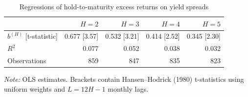 \begin{table}[htbp]
\centering
\caption{Regressions of hold-to-maturity excess returns on yield spreads}
\label{tab:q4b}
\begin{tabular}{lrrrr}
\toprule
 & $H=2$ & $H=3$ & $H=4$ & $H=5$ \\
\midrule
$b^{(H)}$ [t-statistic] & 0.677 [3.57] & 0.532 [3.21] & 0.414 [2.52] & 0.345 [2.30] \\
$R^2$ & 0.077 & 0.052 & 0.038 & 0.032 \\
Observations & 859 & 847 & 835 & 823 \\
\bottomrule
\end{tabular}
\begin{minipage}{0.92\textwidth}
\footnotesize\textit{Note:} OLS estimates. Brackets contain Hansen--Hodrick (1980) t-statistics using uniform weights and $L=12H-1$ monthly lags.
\end{minipage}
\end{table}
